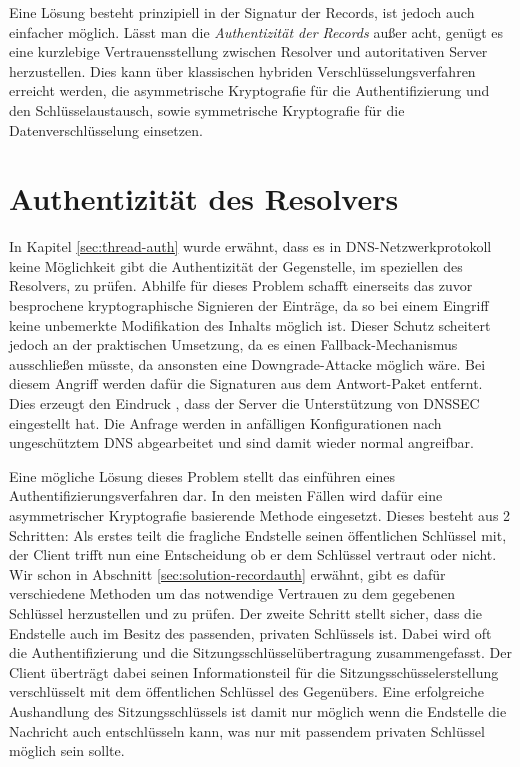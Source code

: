 Eine Lösung besteht prinzipiell in der Signatur der Records, ist jedoch auch einfacher möglich. Lässt man die \textit{Authentizität der Records} außer acht, genügt es eine kurzlebige Vertrauensstellung zwischen Resolver und autoritativen Server herzustellen. Dies kann über klassischen hybriden Verschlüsselungsverfahren erreicht werden, die asymmetrische Kryptografie für die Authentifizierung und den Schlüsselaustausch, sowie symmetrische Kryptografie für die Datenverschlüsselung einsetzen.

\section{Authentizität des Resolvers}
In Kapitel \ref{sec:thread-auth} wurde erwähnt, dass es in DNS-Netzwerkprotokoll keine Möglichkeit gibt die Authentizität der Gegenstelle, im speziellen des Resolvers, zu prüfen. Abhilfe für dieses Problem schafft einerseits das zuvor besprochene kryptographische Signieren der Einträge, da so bei einem Eingriff keine unbemerkte Modifikation des Inhalts möglich ist. Dieser Schutz scheitert jedoch an der praktischen Umsetzung, da es einen Fallback-Mechanismus ausschließen müsste, da ansonsten eine Downgrade-Attacke möglich wäre\cite{Bau2010}. Bei diesem Angriff werden dafür die Signaturen aus dem Antwort-Paket entfernt. Dies erzeugt den Eindruck , dass der Server die Unterstützung von DNSSEC eingestellt hat. Die Anfrage werden in anfälligen Konfigurationen nach ungeschütztem DNS abgearbeitet und sind damit wieder normal angreifbar.  

Eine mögliche Lösung dieses Problem stellt das einführen eines Authentifizierungsverfahren dar. In den meisten Fällen wird dafür eine asymmetrischer Kryptografie basierende Methode eingesetzt. Dieses besteht aus 2 Schritten: Als erstes teilt die fragliche Endstelle seinen öffentlichen Schlüssel mit, der Client trifft nun eine Entscheidung ob er dem Schlüssel vertraut oder nicht. Wir schon in Abschnitt \ref{sec:solution-recordauth} erwähnt, gibt es dafür verschiedene Methoden um das notwendige Vertrauen zu dem gegebenen Schlüssel herzustellen und zu prüfen. Der zweite Schritt stellt sicher, dass die Endstelle auch im Besitz des passenden, privaten Schlüssels ist. Dabei wird oft die Authentifizierung und die Sitzungsschlüsselübertragung zusammengefasst. Der Client überträgt dabei seinen Informationsteil für die Sitzungsschüsselerstellung verschlüsselt mit dem öffentlichen Schlüssel des Gegenübers. Eine erfolgreiche Aushandlung des Sitzungsschlüssels ist damit nur möglich wenn die Endstelle die Nachricht auch entschlüsseln kann, was nur mit passendem privaten Schlüssel möglich sein sollte. 

